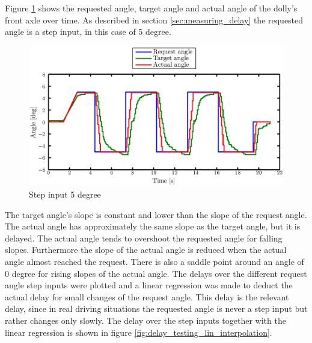 \documentclass[ExampleMasters.tex]{subfiles}
\begin{document}
Figure \ref{fig:step_input} shows the requested angle, target angle and actual angle of the dolly's front axle over time. As described in section \ref{sec:measuring_delay} the requested angle is a step input, in this case of 5 degree.\\
\begin{figure}[!hbt]
	\centering
	\includegraphics[width=1\linewidth]{figures/lifted_front_5deg}
	\caption{Step input 5 degree}
	
	\label{fig:step_input}
\end{figure}
The target angle's slope is constant and lower than the slope of the request angle. The actual angle has approximately the same slope as the target angle, but it is delayed. The actual angle tends to overshoot the requested angle for falling slopes. Furthermore the slope of the actual angle is reduced when the actual angle almost reached the request. There is also a saddle point around an angle of 0 degree for rising slopes of the actual angle.          
The delays over the different request angle step inputs were plotted and a linear regression was made to deduct the actual delay for small changes of the request angle. This delay is the relevant delay, since in real driving situations the requested angle is never a step input but rather changes only slowly. The delay over the step inputs together with the linear regression is shown in figure \ref{fig:delay_testing_lin_interpolation}.    
\end{document}
